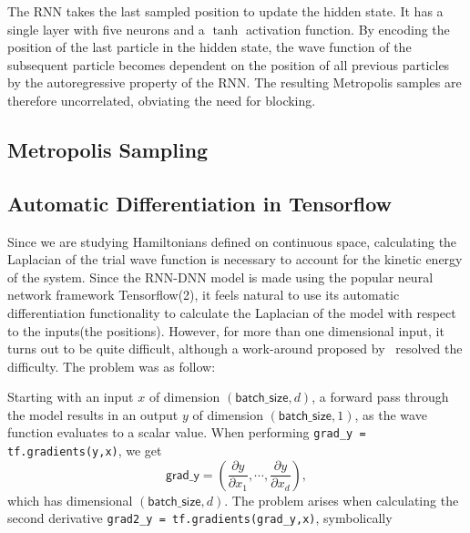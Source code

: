 The RNN takes the last sampled position to update the hidden state. It has a
single layer with five neurons and a \(\tanh\) activation function. 
By encoding the position of the last particle in the hidden state, the wave
function of the subsequent particle becomes dependent on the position of all
previous particles by the autoregressive property of the RNN. The resulting
Metropolis samples are therefore uncorrelated, obviating the need for blocking.

\subsection{Metropolis Sampling}


\subsection{Automatic Differentiation in Tensorflow}
Since we are studying Hamiltonians defined on continuous space, calculating the
Laplacian of the trial wave function is necessary to account for the kinetic
energy of the system. Since the RNN-DNN model is made using the popular neural
network framework Tensorflow(2), it feels natural to use its automatic
differentiation functionality to calculate the Laplacian of the model with
respect to the inputs(the positions). However, for more than one dimensional
input, it turns out to be quite difficult, although a work-around proposed by~\cite{laplace}
resolved the difficulty. The problem was as follow:  

Starting with an input $x$ of dimension $(\textsf{batch\_size}, d)$, a forward
pass through the model results in an output $y$ of dimension $(\textsf{batch\_size}, 1)$,
as the wave function evaluates to a scalar value. When performing
\texttt{grad_y = tf.gradients(y,x)}, we get  
\begin{equation*}
	\textsf{grad\_y} = \left(\frac{\partial y}{\partial x_1}, \cdots, \frac{\partial y}{\partial x_d}\right),
\end{equation*}
which has dimensional $(\textsf{batch\_size}, d)$. The problem arises when
calculating the second
derivative \texttt{grad2_y = tf.gradients(grad_y,x)}, symbolically

